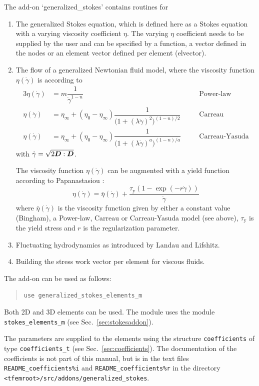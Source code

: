 The add-on `generalized\_stokes' contains routines for
\begin{enumerate}
 \item The generalized Stokes equation, which is defined here as
a Stokes equation with a varying viscosity coefficient $\eta$. The varying $\eta$
coefficient needs to be supplied by the user and can
be specified by a function, a vector defined in the nodes or an element vector
defined per element (elvector).
 \item The flow of a generalized Newtonian fluid model, where the viscosity function $\eta(\dot\gamma)$ is
       according to
       \begin{alignat*}{3}
   \eta(\dot\gamma) &= m\dfrac{1}{\dot\gamma^{1-n}} & \quad&\text{Power-law}\\
   \eta(\dot\gamma) &= \eta_\infty + (\eta_0-\eta_\infty)
\dfrac{1}{\big(1+(\lambda\dot\gamma)^2\big)^{(1-n)/2}} &
          \quad&\text{Carreau}\\
   \eta(\dot\gamma) &= \eta_\infty + (\eta_0-\eta_\infty)
\dfrac{1}{\big(1+(\lambda\dot\gamma)^a\big)^{(1-n)/a}} &
          \quad&\text{Carreau-Yasuda}
\end{alignat*}
  with $\dot\gamma=\sqrt{2\boldsymbol{D}:\boldsymbol{D}}$.

The viscosity function $\eta(\dot\gamma)$ can be augmented with a yield function
 according to Papanastasiou \cite{Papanastasiou87}:
\[
     \eta(\dot\gamma) = \bar\eta(\dot\gamma) +
       \dfrac{\tau_\text{y} \left( 1 - \exp(-r \dot\gamma) \right)}{\dot\gamma}
\]
where $\bar\eta(\dot\gamma)$ is the viscosity function given by either a constant value (Bingham), a Power-law, Carreau or Carreau-Yasuda model (see above), $\tau_\text{y}$ is the yield stress and $r$ is the regularization parameter.

 \item Fluctuating hydrodynamics as introduced by Landau and Lifshitz.
 \item Building the stress work vector per element for viscous fluids.
\end{enumerate}
The add-on can be used as follows:
\begin{quote}
   \texttt{use generalized\_stokes\_elements\_m}
\end{quote}
Both 2D and 3D elements can be used.
The module uses the module \texttt{stokes\_elements\_m}
 (see Sec.~\ref{sec:stokesaddon}).

The parameters are
supplied to the elements using the structure \texttt{coefficients} of type
\texttt{coefficients\_t} (see Sec.~\ref{sec:coefficients}). The documentation
of the coefficients is not part of this manual, but is in the text files
\texttt{README\_coefficients\%i} and
\texttt{README\_coefficients\%r} in the directory
\texttt{<tfemroot>/src/addons/generalized\_stokes}.

